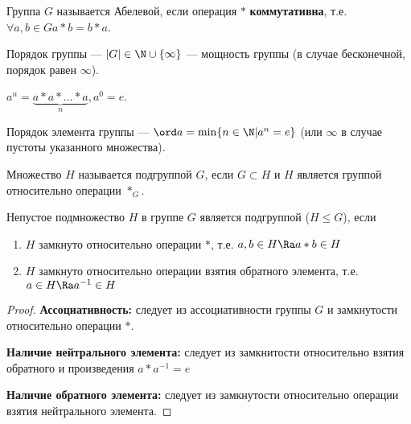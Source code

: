 \begin{definition}
    Группа \(G\) называется Абелевой, если операция \(*\) \textbf{коммутативна}, т.е. \(\forall a, b \in G a * b = b * a\).
\end{definition}

\begin{definition}
    Порядок группы --- \(|G| \in \N \cup \{\infty\}\) --- мощность группы (в случае бесконечной, порядок равен \(\infty\)).
\end{definition}

\begin{definition}
    \(a^n = \underbrace{a * a * \dots * a}_{n}, a^0 = e\).
\end{definition}

\begin{definition}
    Порядок элемента группы --- \(\ord a = \min\{n \in \N | a^n = e\}\) (или \(\infty\) в случае пустоты указанного множества).
\end{definition}

\begin{definition}
    Множество \(H\) называется подгруппой \(G\), если \(G \subset H\) и \(H\) является группой относительно операции \(*_G\).
\end{definition}

\begin{proposition}
    Непустое подмножество \(H\) в группе \(G\) является подгруппой (\(H \le G\)), если
    \begin{enumerate}
        \item \(H\) замкнуто относительно операции \(*\), т.е. \(a, b \in H \Ra a * b \in H\)
        \item \(H\) замкнуто относительно операции взятия обратного элемента, т.е. \(a \in H \Ra a ^{-1} \in H\)
    \end{enumerate}
\end{proposition}
\begin{proof}
    \item \textbf{Ассоциативность:} следует из ассоциативности группы \(G\) и замкнутости относительно операции \(*\).
    \item \textbf{Наличие нейтрального элемента:} следует из замкнитости относительно взятия обратного и произведения \(a * a^{-1} = e\)
    \item \textbf{Наличие обратного элемента:} следует из замкнутости относительно операции взятия нейтрального элемента.
\end{proof}

